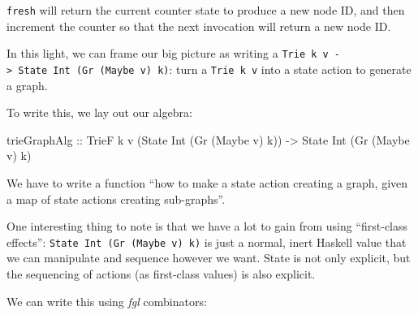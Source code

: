 \documentclass[]{article}
\newenvironment{Shaded}{}{}
\newcommand{\DataTypeTok}[1]{\textcolor[rgb]{0.56,0.13,0.00}{#1}}
\newcommand{\NormalTok}[1]{#1}
\newcommand{\OtherTok}[1]{\textcolor[rgb]{0.00,0.44,0.13}{#1}}
\begin{document}
\texttt{fresh} will return the current counter state to produce a new node ID,
and then increment the counter so that the next invocation will return a new
node ID.

In this light, we can frame our big picture as writing a
\texttt{Trie\ k\ v\ -\textgreater{}\ State\ Int\ (Gr\ (Maybe\ v)\ k)}: turn a
\texttt{Trie\ k\ v} into a state action to generate a graph.

To write this, we lay out our algebra:

\begin{Shaded}
\begin{Highlighting}[]
\NormalTok{trieGraphAlg}
\OtherTok{    ::} \DataTypeTok{TrieF}\NormalTok{ k v (}\DataTypeTok{State} \DataTypeTok{Int}\NormalTok{ (}\DataTypeTok{Gr}\NormalTok{ (}\DataTypeTok{Maybe}\NormalTok{ v) k))}
    \OtherTok{->} \DataTypeTok{State} \DataTypeTok{Int}\NormalTok{ (}\DataTypeTok{Gr}\NormalTok{ (}\DataTypeTok{Maybe}\NormalTok{ v) k)}
\end{Highlighting}
\end{Shaded}

We have to write a function ``how to make a state action creating a graph, given
a map of state actions creating sub-graphs''.

One interesting thing to note is that we have a lot to gain from using
``first-class effects'': \texttt{State\ Int\ (Gr\ (Maybe\ v)\ k)} is just a
normal, inert Haskell value that we can manipulate and sequence however we want.
State is not only explicit, but the sequencing of actions (as first-class
values) is also explicit.

We can write this using \emph{fgl} combinators:
\end{document}
